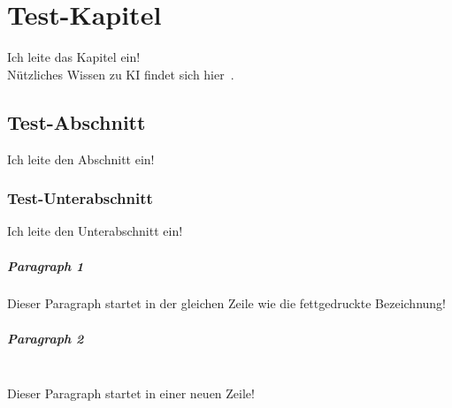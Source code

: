 

\chapter{Test-Kapitel}\label{ch:test_kapitel}

Ich leite das Kapitel ein!
\\ %
Nützliches Wissen zu KI findet sich hier~\cite{dive_into_deep_learning}.

\section{Test-Abschnitt}\label{sec:test_abschnitt}

Ich leite den Abschnitt ein!

\subsection{Test-Unterabschnitt}\label{subsec:test_unterabschnitt}

Ich leite den Unterabschnitt ein!

\paragraph{Paragraph 1}\label{par:test_paragraph_1}
Dieser Paragraph startet in der gleichen Zeile wie die fettgedruckte Bezeichnung!

\paragraph{Paragraph 2}\label{par:test_paragraph_2}
~\\ %
Dieser Paragraph startet in einer neuen Zeile!

\pagebreak
